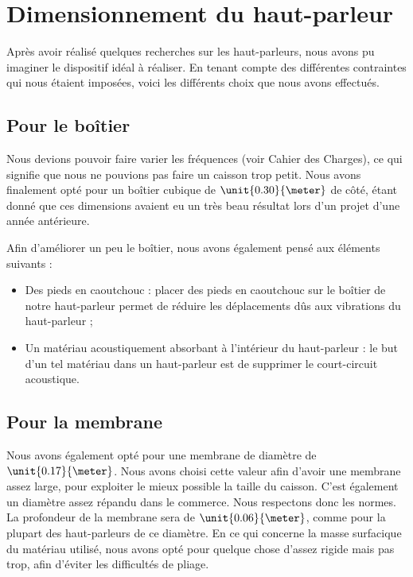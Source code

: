 

\section{Dimensionnement du haut-parleur}
Après avoir réalisé quelques recherches sur les haut-parleurs, nous avons pu imaginer le dispositif idéal à réaliser. En tenant compte des différentes contraintes qui nous étaient imposées, voici les différents choix que nous avons effectués.

\subsection{Pour le boîtier}
Nous devions pouvoir faire varier les fréquences (voir Cahier des Charges), ce qui signifie que nous ne pouvions pas faire un caisson trop petit. Nous avons finalement opté pour un
boîtier cubique de $\unit{0.30}{\meter}$ de côté, étant donné que ces dimensions avaient eu un très beau résultat lors d'un projet d'une année antérieure.

Afin d'améliorer un peu le boîtier, nous avons également pensé aux éléments suivants :

\begin{itemize}
	\item	Des pieds en caoutchouc : placer des pieds en caoutchouc sur le boîtier de notre haut-parleur
				permet de réduire les déplacements dûs aux vibrations du haut-parleur ;
	\item	Un matériau acoustiquement absorbant à l'intérieur du haut-parleur : le but d'un tel matériau
				dans un haut-parleur est de supprimer le court-circuit acoustique.
\end{itemize}

\subsection{Pour la membrane}
Nous avons également opté pour une membrane de diamètre de $\unit{0.17}{\meter}$. Nous avons choisi cette valeur afin d'avoir une membrane assez large, pour exploiter le mieux possible la taille du caisson. C'est également un diamètre assez répandu dans le commerce. Nous respectons donc les normes.
La profondeur de la membrane sera de $\unit{0.06}{\meter}$, comme pour la plupart des haut-parleurs de ce diamètre. En ce qui concerne la masse surfacique du matériau utilisé, nous avons opté pour quelque chose d'assez rigide mais pas trop, afin d'éviter les difficultés de pliage.

